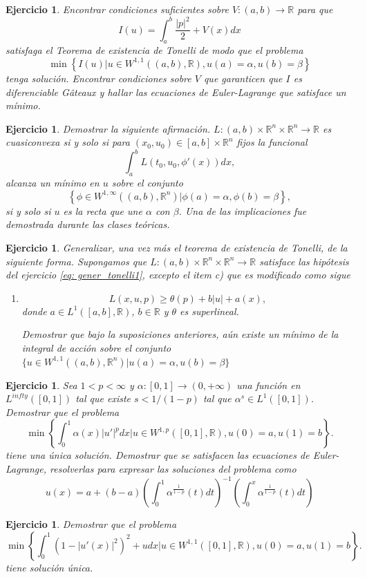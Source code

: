 \documentclass{article}
\newcounter{ejer}
\newtheorem{ejercicio}[ejer]{Ejercicio}}
\newcommand{\rr}{\mathbb{R}}
\begin{document}
\begin{ejercicio} Encontrar condiciones suficientes sobre $V:(a,b)\to\rr$ para que
\[I(u)=\int_a^b\frac{|p|^2}{2}+V(x)dx\]
satisfaga el Teorema de existencia de Tonelli de modo que el problema
\[\min\left\{I(u)\bigg| u\in W^{1,1}((a,b),\rr), u(a)=\alpha, u(b)=\beta\right\}\]
tenga solución. Encontrar condiciones  sobre $V$ que garanticen que $I$ es diferenciable G\^ateaux y hallar las ecuaciones de Euler-Lagrange que satisface un mínimo.

\end{ejercicio}

\begin{ejercicio} Demostrar la siguiente afirmación. $L:(a,b)\times\rr^n\times\rr^n\to\rr$ es cuasiconvexa si y solo si para $(x_0,u_0)\in [a,b]\times\rr^n$ fijos la funcional
\[\int_a^bL(t_0,u_0,\phi'(x))dx,\]
alcanza un mínimo en $u$ sobre el conjunto
\[\left\{\phi\in W^{1,\infty}((a,b),\rr^n)| \phi(a)=\alpha, \phi(b)=\beta\right\},\]
si y solo si $u$ es la recta que une $\alpha$ con $\beta$. Una de las implicaciones fue demostrada durante las clases teóricas.

\end{ejercicio}

\begin{ejercicio} Generalizar, una vez más el teorema de existencia de Tonelli, de la siguiente forma.  Supongamos que $L:(a,b)\times\rr^n\times\rr^n\to\rr$ satisface las hipótesis del ejercicio \ref{eq: gener_tonelli1}, excepto el item c) que es modificado como sigue
\begin{enumerate}
 \item[c')] \[L(x,u,p)\geq \theta(p)+b|u|+a(x),\]
 donde $a\in L^1([a,b],\rr)$, $b\in\rr$  y $\theta$ es superlineal.

 Demostrar que bajo la suposiciones anteriores, aún existe un mínimo de la integral de acción sobre el conjunto $\{u\in W^{1,1}((a,b),\rr^n)| u(a)=\alpha, u(b)=\beta\}$
\end{enumerate}


\end{ejercicio}



\begin{ejercicio} Sea $1<p<\infty$ y $\alpha:[0,1]\to (0,+\infty)$ una función en $ L^{infty}([0,1])$  tal que existe $s<1/(1-p)$ tal que $\alpha^s\in L^{1}([0,1])$. Demostrar que el problema
\[\min\left\{\int_0^1\alpha(x)|u'|^pdx\bigg|u\in W^{1,p}([0,1],\rr), u(0)=a,u(1)=b\right\}.\]
tiene una única solución. Demostrar que se satisfacen las ecuaciones de Euler-Lagrange, resolverlas para expresar las soluciones del problema como
\[u(x)=a+(b-a)\left(\int_0^1\alpha^\frac{1}{1-p}(t)dt\right)^{-1}\left(\int_0^x\alpha^\frac{1}{1-p}(t)dt\right)\]


\end{ejercicio}


\begin{ejercicio} Demostrar que el problema
 \[\min\left\{\int_0^1(1-|u'(x)|^2)^2+udx\bigg|u\in W^{1,1}([0,1],\rr), u(0)=a,u(1)=b\right\}.\]
 tiene solución única.
\end{ejercicio}
\end{document}
